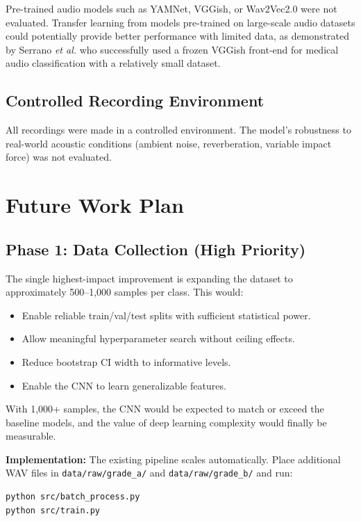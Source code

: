 \documentclass[12pt,a4paper,oneside]{report}
\begin{document}
Pre-trained audio models such as YAMNet, VGGish, or Wav2Vec2.0 were not evaluated. Transfer learning from models pre-trained on large-scale audio datasets could potentially provide better performance with limited data, as demonstrated by Serrano \textit{et al.} \cite{serrano2024} who successfully used a frozen VGGish front-end for medical audio classification with a relatively small dataset.

\subsection{Controlled Recording Environment}

All recordings were made in a controlled environment. The model's robustness to real-world acoustic conditions (ambient noise, reverberation, variable impact force) was not evaluated.

\section{Future Work Plan}

\subsection{Phase 1: Data Collection (High Priority)}

The single highest-impact improvement is expanding the dataset to approximately 500--1,000 samples per class. This would:
\begin{itemize}
    \item Enable reliable train/val/test splits with sufficient statistical power.
    \item Allow meaningful hyperparameter search without ceiling effects.
    \item Reduce bootstrap CI width to informative levels.
    \item Enable the CNN to learn generalizable features.
\end{itemize}

With 1,000+ samples, the CNN would be expected to match or exceed the baseline models, and the value of deep learning complexity would finally be measurable.

\textbf{Implementation:} The existing pipeline scales automatically. Place additional WAV files in \texttt{data/raw/grade\_a/} and \texttt{data/raw/grade\_b/} and run:
\begin{verbatim}
python src/batch_process.py
python src/train.py
\end{verbatim}
\end{document}
